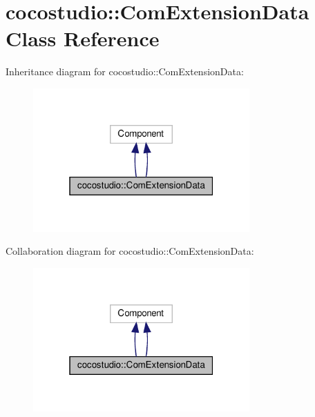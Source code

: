 \hypertarget{classcocostudio_1_1ComExtensionData}{}\section{cocostudio\+:\+:Com\+Extension\+Data Class Reference}
\label{classcocostudio_1_1ComExtensionData}


Inheritance diagram for cocostudio\+:\+:Com\+Extension\+Data\+:
\nopagebreak
\begin{figure}[H]
\begin{center}
\leavevmode
\includegraphics[width=235pt]{classcocostudio_1_1ComExtensionData__inherit__graph}
\end{center}
\end{figure}


Collaboration diagram for cocostudio\+:\+:Com\+Extension\+Data\+:
\nopagebreak
\begin{figure}[H]
\begin{center}
\leavevmode
\includegraphics[width=235pt]{classcocostudio_1_1ComExtensionData__coll__graph}
\end{center}
\end{figure}
